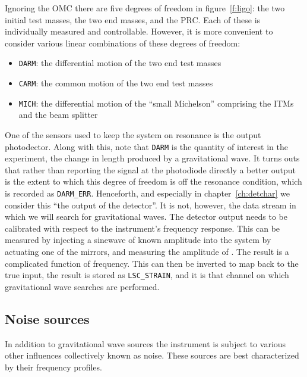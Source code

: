 Ignoring the OMC there are five degrees of freedom in
figure~\ref{f:ligo}: the two initial test masses, the two end masses,
and the PRC.  Each of these is individually measured and controllable.
However, it is more convenient to consider various linear combinations
of these degrees of freedom:

\begin{itemize}
\item \texttt{DARM}: the differential motion of the two end test masses
\item \texttt{CARM}: the common motion of the two end test masses
\item \texttt{MICH}: the differential motion of the ``small Michelson'' comprising
the ITMs and the beam splitter
\end{itemize}

One of the sensors used to keep the system on resonance is the output
photodector.  Along with this, note that \texttt{DARM} is the quantity
of interest in the experiment, the change in length produced by a
gravitational wave.    It turns outs that rather than reporting the
signal at the photodiode directly a better output is the extent to
which this degree of freedom is off the resonance condition, which is
recorded as \texttt{DARM\_ERR}.  Henceforth, and especially in
chapter~\ref{ch:detchar} we consider this ``the output of the
detector''.  It is not, however, the data stream in which we will
search for gravitational waves.  The detector output needs to be
calibrated with respect to the instrument's frequency response.  This
can be measured by injecting a sinewave of known amplitude into the
system by actuating one of the mirrors, and measuring the amplitude of
\darmerr.  The result is a complicated function of frequency.  This
can then be inverted to map \darmerr back to the true input, the
result is stored as \texttt{LSC\_STRAIN}, and it is that channel on
which gravitational wave searches are performed.

\subsection{Noise sources}
\label{sec:noise_sources}

In addition to gravitational wave sources the instrument is subject to
various other influences collectively known as noise.  These sources
are best characterized by their frequency profiles.

